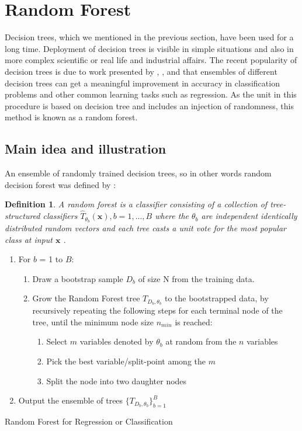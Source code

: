 \section{Random Forest}
Decision trees, which we mentioned in the previous section, have been used for a long time. 
Deployment of decision trees is visible in simple situations and also in more complex scientific or real life and industrial affairs.
The recent popularity of decision trees is due to work presented by 
\cite{Breiman1996OUT-OF-BAG-E}, \cite{breiman2001random}, and \cite{breiman2004consistency} that ensembles of 
different decision trees can get a meaningful improvement in accuracy in classification problems and other 
common learning tasks such as regression. As the unit in this procedure is based on decision tree and includes an injection of
randomness, this method is known as a random forest. 

\subsection{Main idea and illustration}
An ensemble of randomly trained decision trees, so in other words random decision forest was defined by \cite{breiman2001random}:

\newtheorem{definition}{Definition}
\begin{definition}
	A random forest is a classifier consisting of a collection of tree-structured classifiers ${\hat{T}_{\theta_{b}}(\textbf{x})}, b = 1,...,B$ where the $\theta_{b}$ are independent identically
	distributed random vectors and each tree casts a unit vote for the most popular class at input $\textbf{x}$ .
\end{definition}

\begin{algorithm}[H]
\SetAlgoLined
\begin{enumerate}
	\item For $b$ = 1 to $B$:
	\begin{enumerate}
	    \item Draw a bootstrap sample $D_{b}$ of size N from the training data.
	    \item Grow the Random Forest tree ${{T}_{D_{b},\theta_{b}}}$ to the bootstrapped data, by recursively repeating the following steps for each terminal node of the tree, until the minimum node size $n_{min}$ is reached:
	    \begin{enumerate}
	       \item Select $m$ variables denoted by $\theta_{b}$ at random from the $n$ variables
	       \item Pick the best variable/split-point among the $m$
	       \item  Split the node into two daughter nodes
	    \end{enumerate}
	\end{enumerate}
	\item  Output the ensemble of trees $\{{T}_{D_{b},\theta_{b}}\}_{b=1}^{B}$
\end{enumerate}
 \caption{Random Forest for Regression or Classification \cite{friedman2001elements}}
\end{algorithm}

